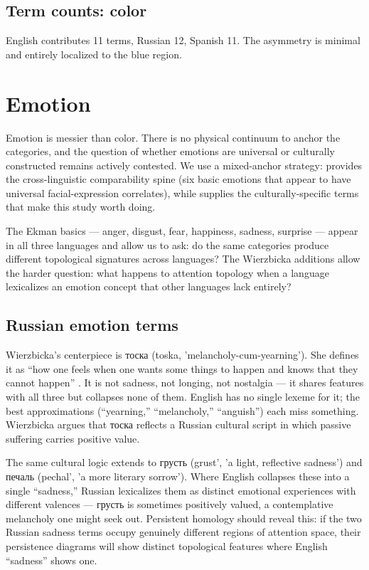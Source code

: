 \subsection{Term counts: color}

English contributes 11 terms, Russian 12, Spanish 11. The asymmetry is minimal and entirely localized to the blue region.

\section{Emotion}
\label{sec:emotion}

Emotion is messier than color. There is no physical continuum to anchor the categories, and the question of whether emotions are universal or culturally constructed remains actively contested. We use a mixed-anchor strategy: \textcite{ekman1992} provides the cross-linguistic comparability spine (six basic emotions that appear to have universal facial-expression correlates), while \textcite{wierzbicka1999} supplies the culturally-specific terms that make this study worth doing.

The Ekman basics --- anger, disgust, fear, happiness, sadness, surprise --- appear in all three languages and allow us to ask: do the same categories produce different topological signatures across languages? The Wierzbicka additions allow the harder question: what happens to attention topology when a language lexicalizes an emotion concept that other languages lack entirely?

\subsection{Russian emotion terms}
\label{sec:russian-emotion}

Wierzbicka's centerpiece is тоска (toska, 'melancholy-cum-yearning'). She defines it as ``how one feels when one wants some things to happen and knows that they cannot happen'' \parencite[Ch.~2]{wierzbicka1999}. It is not sadness, not longing, not nostalgia --- it shares features with all three but collapses none of them. English has no single lexeme for it; the best approximations (``yearning,'' ``melancholy,'' ``anguish'') each miss something. Wierzbicka argues that тоска reflects a Russian cultural script in which passive suffering carries positive value.

The same cultural logic extends to грусть (grust', 'a light, reflective sadness') and печаль (pechal', 'a more literary sorrow'). Where English collapses these into a single ``sadness,'' Russian lexicalizes them as distinct emotional experiences with different valences --- грусть is sometimes positively valued, a contemplative melancholy one might seek out. Persistent homology should reveal this: if the two Russian sadness terms occupy genuinely different regions of attention space, their persistence diagrams will show distinct topological features where English ``sadness'' shows one.

